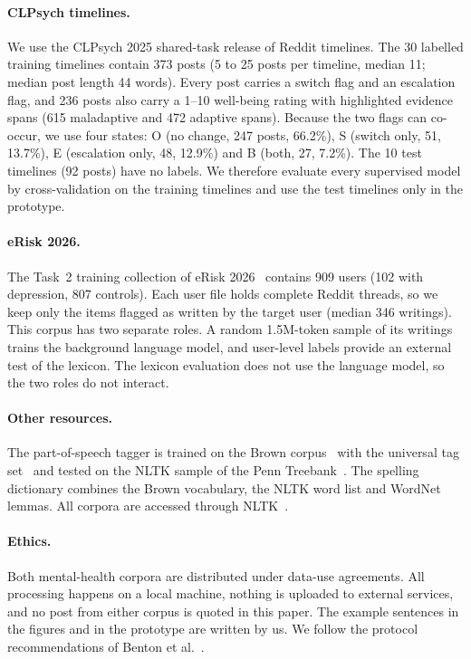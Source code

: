 \documentclass[runningheads]{llncs}
\newcommand{\state}[1]{\textsc{#1}}
\begin{document}
\paragraph{CLPsych timelines.}
We use the CLPsych 2025 shared-task release of Reddit timelines. The 30 labelled training timelines contain 373 posts (5 to 25 posts per timeline, median 11; median post length 44 words). Every post carries a switch flag and an escalation flag, and 236 posts also carry a 1--10 well-being rating with highlighted evidence spans (615 maladaptive and 472 adaptive spans). Because the two flags can co-occur, we use four states: \state{O} (no change, 247 posts, 66.2\%), \state{S} (switch only, 51, 13.7\%), \state{E} (escalation only, 48, 12.9\%) and \state{B} (both, 27, 7.2\%). The 10 test timelines (92 posts) have no labels. We therefore evaluate every supervised model by cross-validation on the training timelines and use the test timelines only in the prototype.

\paragraph{eRisk 2026.}
The Task~2 training collection of eRisk 2026~\cite{erisk2026} contains 909 users (102 with depression, 807 controls). Each user file holds complete Reddit threads, so we keep only the items flagged as written by the target user (median 346 writings). This corpus has two separate roles. A random 1.5M-token sample of its writings trains the background language model, and user-level labels provide an external test of the lexicon. The lexicon evaluation does not use the language model, so the two roles do not interact.

\paragraph{Other resources.}
The part-of-speech tagger is trained on the Brown corpus~\cite{francis1979brown} with the universal tag set~\cite{petrov2012universal} and tested on the NLTK sample of the Penn Treebank~\cite{marcus1993building}. The spelling dictionary combines the Brown vocabulary, the NLTK word list and WordNet~\cite{miller1995wordnet} lemmas. All corpora are accessed through NLTK~\cite{bird2009natural}.

\paragraph{Ethics.}
Both mental-health corpora are distributed under data-use agreements. All processing happens on a local machine, nothing is uploaded to external services, and no post from either corpus is quoted in this paper. The example sentences in the figures and in the prototype are written by us. We follow the protocol recommendations of Benton et al.~\cite{benton2017ethical}.
\end{document}
